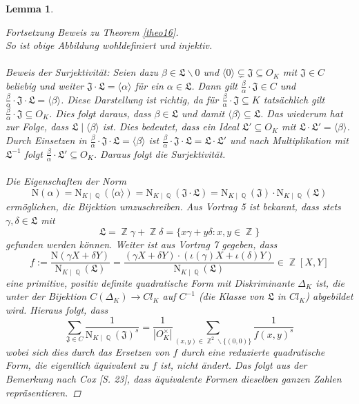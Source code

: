 \documentclass[10pt,a4paper]{article}
\theoremstyle{plain}
\newtheorem{lem}[thm]{Lemma}
\theoremstyle{definition}
\theoremstyle{remark}
\DeclareMathOperator{\Q}{\mathbb{Q}}
\DeclareMathOperator{\Z}{\mathbb{Z}}
\begin{document}
\begin{lem}
\begin{proof}[Fortsetzung Beweis zu Theorem \ref{theo16}]
\\
So ist obige Abbildung wohldefiniert und injektiv.\\
\\
Beweis der Surjektivität:
Seien dazu $\beta \in \mathfrak{L}\backslash{0}$ und  $\langle 0 \rangle \subsetneq \mathfrak{J} \subseteq O_K$ mit $\mathfrak{J} \in C$ beliebig und weiter $\mathfrak{J\cdot L}= \langle \alpha \rangle$ für ein $\alpha \in \mathfrak{L}$. Dann gilt $\frac{\beta}{\alpha} \cdot \mathfrak{J} \in C$ und $\frac{\beta}{\alpha} \cdot \mathfrak{J\cdot L} = \langle \beta\rangle$. Diese Darstellung ist richtig, da für $\frac{\beta}{\alpha} \cdot \mathfrak{J} \subseteq K$ tatsächlich gilt $\frac{\beta}{\alpha} \cdot \mathfrak{J} \subseteq O_K$. Dies folgt daraus, dass $\beta \in \mathfrak{L}$ und damit $\langle \beta \rangle \subseteq \mathfrak{L}$. Das wiederum hat zur Folge, dass $\mathfrak{L}\mid \langle \beta \rangle$ ist. Dies bedeutet, dass ein Ideal $\mathfrak{L'}\subseteq O_K$ mit $\mathfrak{L\cdot L'}= \langle \beta \rangle$. Durch Einsetzen in $\frac{\beta}{\alpha} \cdot \mathfrak{J\cdot L} = \langle \beta\rangle$ ist $\frac{\beta}{\alpha} \cdot \mathfrak{J\cdot L} = \mathfrak{L \cdot L'} $ und nach Multiplikation mit $\mathfrak{L^{-1}}$ folgt $\frac{\beta}{\alpha} \cdot \mathfrak{L'}\subseteq O_K$. Daraus folgt die Surjektivität.\\
\\
Die Eigenschaften der Norm $$\mathrm{N}(\alpha)= \mathrm{N}_{K\mid \Q}(\langle \alpha \rangle)=\mathrm{N}_{K\mid \Q}(\mathfrak{J\cdot L})=\mathrm{N}_{K\mid \Q}(\mathfrak{J})\cdot \mathrm{N}_{K\mid \Q}(\mathfrak{L})$$ ermöglichen, die Bijektion umzuschreiben. Aus Vortrag 5 ist bekannt, dass stets $\gamma, \delta \in \mathfrak{L}$ mit $$\mathfrak{L}= \Z\gamma+\Z\delta = \{x\gamma+y\delta\colon x,y \in \Z\}$$ gefunden werden können. Weiter ist aus Vortrag 7 gegeben, dass $$f:=\frac{\mathrm{N}(\gamma X+\delta Y)}{\mathrm{N}_{K\mid \Q}(\mathfrak{L})}=\frac{(\gamma X + \delta Y)\cdot (\iota(\gamma)X+\iota(\delta)Y)}{\mathrm{N}_{K\mid \Q}(\mathfrak{L})} \in \Z[X,Y]$$eine primitive, positiv definite quadratische Form mit Diskriminante $\Delta_K$ ist, die unter der Bijektion $C(\Delta_K)\rightarrow Cl_K$ auf $C^{-1}$ (die Klasse von $\mathfrak{L}$ in $Cl_K$) abgebildet wird. Hieraus folgt, dass $$\sum_{\mathfrak{J}\in C}\frac{1}{\mathrm{N}_{K\mid \Q }(\mathfrak{J})^s}=\frac{1}{|O_K^{\times}|}\sum_{(x,y)\in \Z^2\backslash \{ (0,0)\}}\frac{1}{f(x,y)^s}$$wobei sich dies durch das Ersetzen von $f$ durch eine reduzierte quadratische Form, die eigentlich äquivalent zu $f$ ist, nicht ändert. Das folgt aus der Bemerkung nach Cox \cite{Cox}[S. 23], dass äquivalente Formen dieselben ganzen Zahlen repräsentieren.

\end{proof}
\end{lem}
\end{document}
